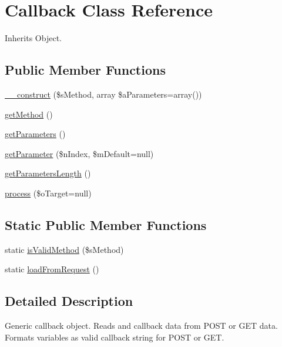 \hypertarget{class_callback}{\section{Callback Class Reference}
\label{class_callback}
}


Inherits Object.

\subsection*{Public Member Functions}
\begin{DoxyCompactItemize}
\item 
\hyperlink{class_callback_a863d80b6321cb84596a04dda89c29f46}{\-\_\-\-\_\-construct} (\$s\-Method, array \$a\-Parameters=array())
\item 
\hyperlink{class_callback_a0f8bdf3326b31265c012b81c58b26c2f}{get\-Method} ()
\item 
\hyperlink{class_callback_adc9e53421dc3f000614c0846504e941b}{get\-Parameters} ()
\item 
\hyperlink{class_callback_a9f8449702ea4b227ca9c2a334ce0679d}{get\-Parameter} (\$n\-Index, \$m\-Default=null)
\item 
\hyperlink{class_callback_a82a3160b5712285a9bf1791f359d0f7b}{get\-Parameters\-Length} ()
\item 
\hyperlink{class_callback_a4db5df546b0cfb38bc4e48694dd422cc}{process} (\$o\-Target=null)
\end{DoxyCompactItemize}
\subsection*{Static Public Member Functions}
\begin{DoxyCompactItemize}
\item 
static \hyperlink{class_callback_a0525569a85e6e7183a1a4b0d201d3c2d}{is\-Valid\-Method} (\$s\-Method)
\item 
static \hyperlink{class_callback_a6f515eea83208a3272a5a8e0e23b9b7e}{load\-From\-Request} ()
\end{DoxyCompactItemize}


\subsection{Detailed Description}
Generic callback object. Reads and callback data from P\-O\-S\-T or G\-E\-T data. Formats variables as valid callback string for P\-O\-S\-T or G\-E\-T.

